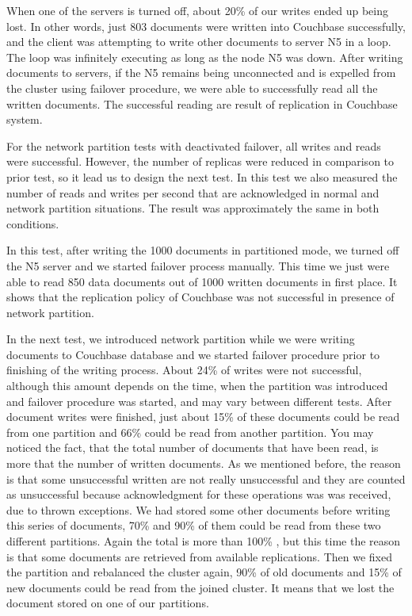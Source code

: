 \documentclass[a4paper]{article}
\begin{document}
When one of the servers is turned off, about 20\% of our writes ended up being lost.
In other words, just 803 documents were written into Couchbase successfully, and the client was attempting to write other documents to server N5 in a loop.
The loop was infinitely executing as long as the node N5 was down.
After writing documents to servers, if the N5 remains being unconnected and is expelled from the cluster using failover procedure, we were able to successfully read all the written documents.
The successful reading are result of replication in Couchbase system.

For the network partition tests with deactivated failover, all writes and reads were successful.  
However, the number of replicas were reduced in comparison to prior test, so it lead us to design the next test. 
In this test we also measured the number of reads and writes per second that are acknowledged in normal and network partition situations.
The result was approximately the same in both conditions.

In this test, after writing the 1000 documents in partitioned mode, we turned off the N5 server and we started failover process manually.
This time we just were able to read 850 data documents out of 1000 written documents in first place. 
It shows that the replication policy of Couchbase was not successful in presence of network partition.

In the next test, we introduced network partition while we were writing documents to Couchbase database and we started failover procedure prior to finishing of the writing process. 
About 24\% of writes were not successful, although this amount depends on the time, when the partition was introduced and failover procedure was started, and may vary between different tests.
After document writes were finished, just about 15\% of these documents could be read from one partition and 66\% could be read from another partition.
You may noticed the fact, that the total number of documents that have been read, is more that the number of written documents.
As we mentioned before, the reason is that some unsuccessful written are not really unsuccessful and they are counted as unsuccessful because acknowledgment for these operations was was received, due to thrown exceptions. 
We had stored some other documents before writing this series of documents, 70\% and 90\% of them could be read from these two different partitions.
Again the total is more than 100\% , but this time the reason is that some documents are retrieved from available replications. 
Then we fixed the partition and rebalanced the cluster again, 90\% of old documents and 15\% of new documents could be read from the joined cluster.
It means that we lost the document stored on one of our partitions.
\end{document}
